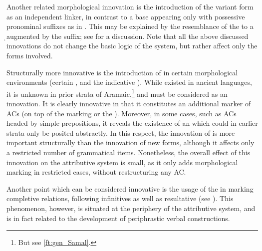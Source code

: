 Another related morphological innovation is the introduction of the variant form  as an independent linker, in contrast to a base appearing only with possessive pronominal suffixes as in \JBA.  This may be explained by the resemblance of the  \lnk* to a \d \lnk* augmented by the \cst* \ed suffix; see  for a discussion. Note that all the above discussed innovations do not change the basic logic of the system, but rather affect only the forms involved.


Structurally more innovative is the introduction of  in certain morphological environments (certain , and the indicative ). While  existed in ancient  languages, it is unknown in prior strata of Aramaic,\footnote{But see \vref{ft:gen_Samal}.} and must be considered as an innovation. It is clearly innovative in that it constitutes an additional marker of ACs (on top of the \cst* marking or the \lnk*). Moreover, in some cases, such as ACs headed by simple prepositions, it reveals the existence of an  which could in earlier strata only be posited abstractly. In this respect, the innovation of  is more important structurally than the innovation of new \cst* forms, although it affects only a restricted number of grammatical items. Nonetheless, the overall effect of this innovation on the attributive system is small, as it only adds  morphological marking in restricted cases, without restructuring any AC.

\largerpage
Another point which can be considered innovative is the usage of the \lnk* in marking completive relations, following infinitives as well as resultative  (see ). This phenomenon, however, is situated at the periphery of the attributive system, and is in fact related to the development of periphrastic verbal constructions.

